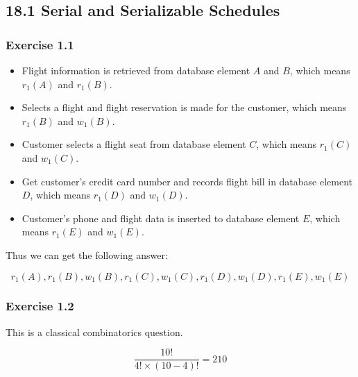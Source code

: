 \documentclass[../../main.tex]{subfiles}
\begin{document}
\subsection{18.1 Serial and Serializable Schedules}

\subsubsection*{Exercise 1.1}

\begin{itemize}
  \item Flight information is retrieved from database element $A$
  and $B$, which means $r_{1}(A)$ and $r_{1}(B)$.
  \item Selects a flight and flight reservation is made for the customer,
  which means $r_{1}(B)$ and $w_{1}(B)$.
  \item Customer selects a flight seat from database element $C$,
  which means $r_{1}(C)$ and $w_{1}(C)$.
  \item Get customer's credit card number and records flight bill in
  database element $D$, which means $r_{1}(D)$ and $w_{1}(D)$.
  \item Customer's phone and flight data is inserted to database element
  $E$, which means $r_{1}(E)$ and $w_{1}(E)$.
\end{itemize}

Thus we can get the following answer:

$$
r_{1}(A), r_{1}(B), w_{1}(B), r_{1}(C), w_{1}(C), r_{1}(D), w_{1}(D), r_{1}(E), w_{1}(E)
$$

\subsubsection*{Exercise 1.2}

This is a classical combinatorics question.

$$
\frac{10!}{4! \times (10 - 4)!} = 210
$$
\end{document}
